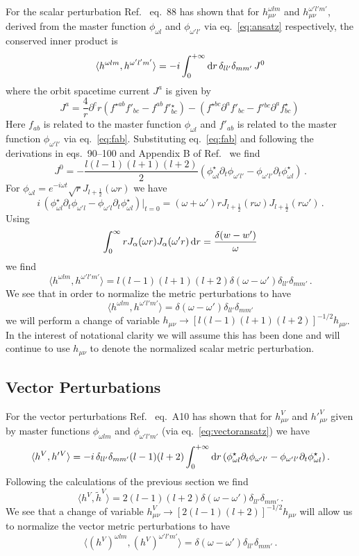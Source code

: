 \documentclass{brownthesis}
\def\dd{{\rm d}}
\begin{document}
For the scalar perturbation Ref.~\cite{doi:10.1142/S0218271816410169}
eq.~88 has shown that for $h_{\mu\nu}^{\omega lm}$ and $h_{\mu\nu}^{\omega'l'm'}$,
derived from the master function $\phi_{\omega l}$ and $\phi_{\omega'l'}$
via eq.~\ref{eq:ansatz} respectively, the conserved inner product
is
\[
\langle h^{\omega lm},h^{\omega'l'm'}\rangle=-i\int_{0}^{+\infty}\dd r\,\delta_{ll'}\delta_{mm'}\,J^{0}
\]
where the orbit spacetime current $J^{a}$ is given by
\[
J^{a}=\frac{4}{r}\partial^{c}r(f^{\star ab}f'_{bc}-f^{ab}f'{}_{bc}^{\star})-(f^{\star bc}\partial^{a}f'_{bc}-f'{}^{bc}\partial^{a}f_{bc}^{\star})\,
\]
Here $f_{ab}$ is related to the master function $\phi_{\omega l}$
and $f'_{ab}$ is related to the master function $\phi_{\omega'l'}$
via eq.~\ref{eq:fab}. Substituting eq.~\ref{eq:fab} and following
the derivations in eqs.~90--100 and Appendix B of Ref.~\cite{doi:10.1142/S0218271816410169}
we find
\[
J^{0}=-\frac{l(l-1)(l+1)(l+2)}{2}(\phi_{\omega l}^{\star}\partial_{t}\phi_{\omega'l'}-\phi_{\omega'l'}\partial_{t}\phi_{\omega l}^{\star})\,.
\]
For $\phi_{\omega l}=e^{-i\omega t}\sqrt{r}J_{l+\frac{1}{2}}(\omega r)$
we have
\[
i\,(\phi_{\omega l}^{\star}\partial_{t}\phi_{\omega'l}-\phi_{\omega'l}\partial_{t}\phi_{\omega l}^{\star})|_{t=0}=(\omega+\omega')rJ_{l+\frac{1}{2}}(r\omega)J_{l+\frac{1}{2}}(r\omega')\,.
\]
Using
\[
\int_{0}^{\infty}rJ_{\alpha}(\omega r)J_{\alpha}(\omega'r)\,\dd r=\frac{\delta(w-w')}{\omega}
\]
we find
\[
\langle h^{\omega lm},h^{\omega'l'm'}\rangle=l(l-1)(l+1)(l+2)\delta(\omega-\omega')\delta_{ll'}\delta_{mm'}\,.
\]
We see that in order to normalize the metric perturbations to have
\[
\langle h^{\omega lm},h^{\omega'l'm'}\rangle=\delta(\omega-\omega')\delta_{ll'}\delta_{mm'}
\]
we will perform a change of variable $h_{\mu\nu}\to[l(l-1)(l+1)(l+2)]^{-1/2}h_{\mu\nu}$.
In the interest of notational clarity we will assume this has been
done and will continue to use $h_{\mu\nu}$ to denote the normalized
scalar metric perturbation.

\subsection{Vector Perturbations}

For the vector perturbations Ref.~\cite{doi:10.1142/S0218271816410169}
eq.~A10 has shown that for $h_{\mu\nu}^{V}$ and $\left.h'\right._{\mu\nu}^{V}$
given by master functions $\phi_{\omega lm}$ and $\phi_{\omega'l'm'}$
(via eq.~\ref{eq:vectoransatz}) we have
\[
\langle h^{V},h'{}^{V}\rangle=-i\,\delta_{ll'}\delta_{mm'}(l-1)(l+2)\int_{0}^{+\infty}\dd r\,(\phi_{\omega l}^{\star}\partial_{t}\phi_{\omega'l'}-\phi_{\omega'l'}\partial_{t}\phi_{\omega l}^{\star})\,.
\]
Following the calculations of the previous section we find
\[
\langle h^{V},\tilde{h}^{V}\rangle=2(l-1)(l+2)\delta(\omega-\omega')\delta_{ll'}\delta_{mm'}\,.
\]
We see that a change of variable $h_{\mu\nu}^{V}\to[2(l-1)(l+2)]^{-1/2}h_{\mu\nu}$
will allow us to normalize the vector metric perturbations to have
\[
\langle(h^{V})^{\omega lm},(h^{V})^{\omega'l'm'}\rangle=\delta(\omega-\omega')\delta_{ll'}\delta_{mm'}\,.
\]
\end{document}
